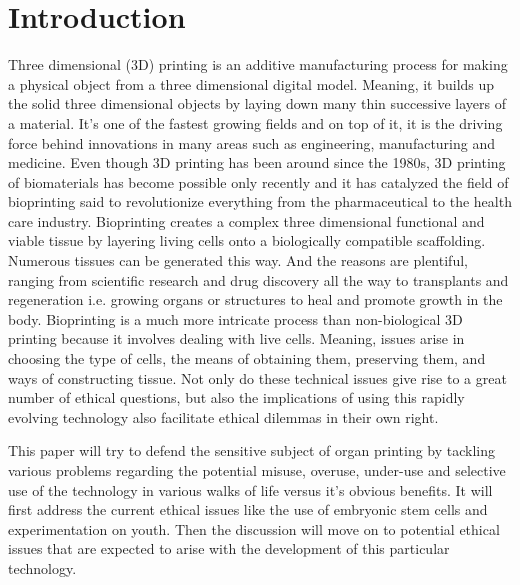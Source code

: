 \documentclass[12pt]{article} %
\begin{document}
\tableofcontents %

\newpage %



\section{Introduction} %

Three dimensional (3D) printing is an additive manufacturing process for making a physical object from a three dimensional digital model. Meaning, it builds up the solid three dimensional objects by laying down many thin successive layers of a material. It's one of the fastest growing fields and on top of it, it is the driving force behind innovations in many areas such as engineering, manufacturing and medicine. Even though 3D printing has been around since the 1980s, 3D printing of biomaterials has become possible only recently and it has catalyzed the field of bioprinting said to revolutionize everything from the pharmaceutical to the health care industry. Bioprinting creates a complex three dimensional functional and viable tissue by layering living cells onto a biologically compatible scaffolding. Numerous tissues can be generated this way. And the reasons are plentiful, ranging from scientific research and drug discovery all the way to transplants and regeneration i.e. growing organs or structures to heal and promote growth in the body. Bioprinting is a much more intricate process than non-biological 3D printing because it involves dealing with live cells. Meaning, issues arise in choosing the type of cells, the means of obtaining them, preserving them, and ways of constructing tissue. Not only do these technical issues give rise to a great number of ethical questions, but also the implications of using this rapidly evolving technology also facilitate ethical dilemmas in their own right. 

This paper will try to defend the sensitive subject of organ printing by tackling various problems regarding the potential misuse, overuse, under-use and selective use of the technology in various walks of life versus it's obvious benefits. It will first address the current ethical issues like the use of embryonic stem cells and experimentation on youth. Then the discussion will move on to potential ethical issues that are expected to arise with the development of this particular technology.
\end{document}
